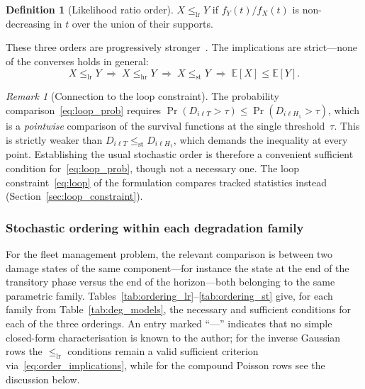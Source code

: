 \documentclass[11pt,a4paper]{article}
\theoremstyle{plain}
\theoremstyle{definition}
\newtheorem{definition}[theorem]{Definition}
\theoremstyle{remark}
\newtheorem{remark}[theorem]{Remark}
\begin{document}
\begin{definition}[Likelihood ratio order]\label{def:lr}
  $X \le_{\mathrm{lr}} Y$ if $f_Y(t)/f_X(t)$ is non-decreasing in $t$ over the union of their supports.
\end{definition}

These three orders are progressively stronger~\cite[Ch.~1]{ShakedShanthikumar2007}.
The implications are strict---none of the converses holds in general:
\begin{equation}\label{eq:order_implications}
  X \le_{\mathrm{lr}} Y
  \;\Longrightarrow\;
  X \le_{\mathrm{hr}} Y
  \;\Longrightarrow\;
  X \le_{\mathrm{st}} Y
  \;\Longrightarrow\;
  \mathbb{E}[X] \le \mathbb{E}[Y].
\end{equation}

\begin{remark}[Connection to the loop constraint]
The probability comparison~\eqref{eq:loop_prob} requires $\Pr(D_{i\ell T} > \tau) \le \Pr(D_{i\ell H_1} > \tau)$, which is a \emph{pointwise} comparison of the survival functions at the single threshold~$\tau$.
This is strictly weaker than $D_{i\ell T} \le_{\mathrm{st}} D_{i\ell H_1}$, which demands the inequality at every point.
Establishing the usual stochastic order is therefore a convenient sufficient condition for~\eqref{eq:loop_prob}, though not a necessary one.
The loop constraint~\eqref{eq:loop} of the formulation compares tracked statistics instead (Section~\ref{sec:loop_constraint}).
\end{remark}

\subsubsection{Stochastic ordering within each degradation family}

For the fleet management problem, the relevant comparison is between two damage states of the same component---for instance the state at the end of the transitory phase versus the end of the horizon---both belonging to the same parametric family.
Tables~\ref{tab:ordering_lr}--\ref{tab:ordering_st} give, for each family from Table~\ref{tab:deg_models}, the necessary and sufficient conditions for each of the three orderings.
An entry marked ``---'' indicates that no simple closed-form characterisation is known to the author; for the inverse Gaussian rows the $\le_{\mathrm{lr}}$ conditions remain a valid sufficient criterion via~\eqref{eq:order_implications}, while for the compound Poisson rows see the discussion below.
\end{document}
